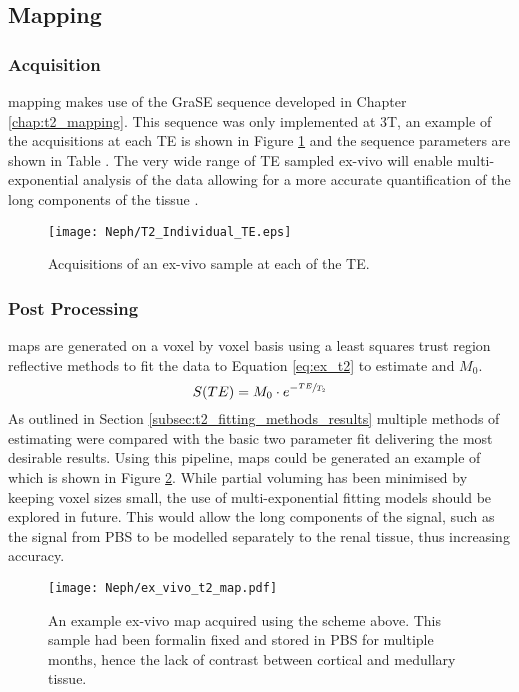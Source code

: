 \subsection{\ttwo Mapping}
\subsubsection{Acquisition}

\ttwo mapping makes use of the \ac{GraSE} sequence developed in Chapter \ref{chap:t2_mapping}. This sequence was only implemented at 3T, an example of the acquisitions at each \ac{TE} is shown in Figure \ref{fig:ex_t2_raw_data} and the sequence parameters are shown in Table . The very wide range of \ac{TE} sampled ex-vivo will enable multi-exponential analysis of the data allowing for a more accurate quantification of the long \ttwo components of the tissue \cite{bjarnason_analyzennls_2010, sabouri_mr_2017}.

\begin{figure}[H]
	\centering
	\texttt{[image: Neph/T2\_Individual\_TE.eps]}
	\caption{Acquisitions of an ex-vivo sample at each of the \ac{TE}.}
	\label{fig:ex_t2_raw_data}	
\end{figure}

\subsubsection{Post Processing}
\ttwo maps are generated on a voxel by voxel basis using a least squares trust region reflective methods to fit the data to Equation \eqref{eq:ex_t2} to estimate \ttwo and $M_0$. 
\begin{equation}
	S(TE) = M_0 \cdot e^{-\sfrac{TE}{T_2}}
	\label{eq:ex_t2}
\end{equation}
As outlined in Section \ref{subsec:t2_fitting_methods_results} multiple methods of estimating \ttwo were compared with the basic two parameter fit delivering the most desirable results. Using this pipeline, \ttwo maps could be generated an example of which is shown in Figure \ref{fig:ex_t2_map}. While partial voluming has been minimised by keeping voxel sizes small, the use of multi-exponential fitting models should be explored in future. This would allow the long \ttwo components of the signal, such as the signal from \ac{PBS} to be modelled separately to the renal tissue, thus increasing accuracy.

\begin{figure}[H]
	\centering
	\texttt{[image: Neph/ex\_vivo\_t2\_map.pdf]}
	\caption{An example ex-vivo \ttwo map acquired using the scheme above. This sample had been formalin fixed and stored in \ac{PBS} for multiple months, hence the lack of contrast between cortical and medullary tissue.}
	\label{fig:ex_t2_map}
\end{figure}

